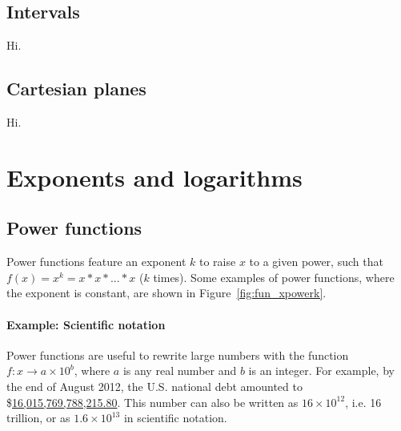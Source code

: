 \subsection{Intervals}%
%
Hi.

\subsection{Cartesian planes}%
%
Hi.

\section{Exponents and logarithms}

\subsection{Power functions}

Power functions feature an exponent $k$ to raise $x$ to a given power, such that $f(x) = x^k = x*x*...*x$ ($k$ times). Some examples of power functions, where the exponent is constant, are shown in Figure~\ref{fig:fun_xpowerk}.

\paragraph{Example: Scientific notation}%
%
Power functions are useful to rewrite large numbers with the function $f: x \to a \times 10^b$, where $a$ is any real number and $b$ is an integer. For example, by the end of August 2012, the U.S. national debt amounted to \$\href{http://www.treasurydirect.gov/NP/BPDLogin?application=np}{16,015,769,788,215.80}. This number can also be written as $16 \times 10^{12}$, i.e. 16 trillion, or as \ensuremath{1.6\times 10^{13}} in scientific notation.

